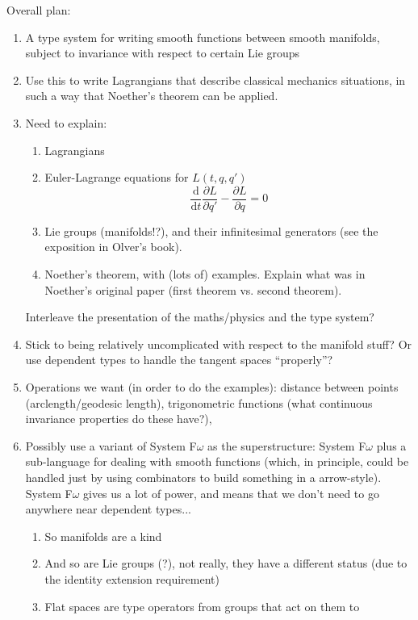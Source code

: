 \documentclass[preprint]{sigplanconf}
\theoremstyle{examplestyle}
\begin{document}
Overall plan:
\begin{enumerate}
\item A type system for writing smooth functions between smooth
  manifolds, subject to invariance with respect to certain Lie groups
\item Use this to write Lagrangians that describe classical mechanics
  situations, in such a way that Noether's theorem can be applied.
\item Need to explain:
  \begin{enumerate}
  \item Lagrangians
  \item Euler-Lagrange equations for $L(t,q,q')$
    \begin{displaymath}
      \frac{\mathrm{d}}{\mathrm{d}t} \frac{\partial L}{\partial q'} - \frac{\partial L}{\partial q} = 0
    \end{displaymath}
  \item Lie groups (manifolds!?), and their infinitesimal generators
    (see the exposition in Olver's book).
  \item Noether's theorem, with (lots of) examples. Explain what was
    in Noether's original paper (first theorem vs. second theorem).
  \end{enumerate}
  Interleave the presentation of the maths/physics and the type
  system?
\item Stick to being relatively uncomplicated with respect to the
  manifold stuff? Or use dependent types to handle the tangent spaces
  ``properly''?
\item Operations we want (in order to do the examples): distance
  between points (arclength/geodesic length), trigonometric functions
  (what continuous invariance properties do these have?),
\item Possibly use a variant of System F$\omega$ as the
  superstructure: System F$\omega$ plus a sub-language for dealing
  with smooth functions (which, in principle, could be handled just by
  using combinators to build something in a arrow-style). System
  F$\omega$ gives us a lot of power, and means that we don't need to
  go anywhere near dependent types...
  \begin{enumerate}
  \item So manifolds are a kind
  \item And so are Lie groups (?), not really, they have a different
    status (due to the identity extension requirement)
  \item Flat spaces are type operators from groups that act on them to

\end{enumerate}
\end{enumerate}
\end{document}
